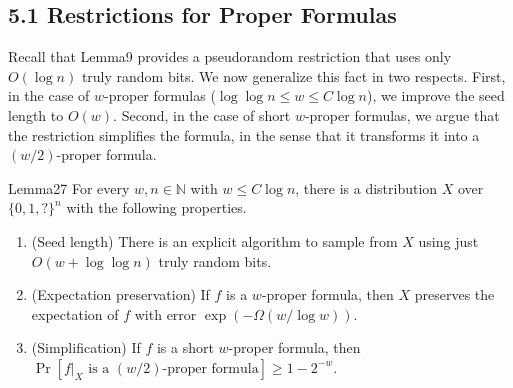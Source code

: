 \subsection*{5.1 Restrictions for Proper Formulas}
Recall that Lemma9 provides a pseudorandom restriction that uses only $O(\log n)$ truly random bits. We now generalize this fact in two respects. First, in the case of $w$-proper formulas ($\log\log n\le w\le C\log n$), we improve the seed length to $O(w)$. Second, in the case of short $w$-proper formulas, we argue that the restriction simplifies the formula, in the sense that it transforms it into a $(w/2)$-proper formula.
\begin{authorclaim}{Lemma27}
For every $w,n\in\mathbb N$ with $w\le C\log n$, there is a distribution $X$ over $\{0,1,?\}^n$ with the following properties.
\begin{enumerate}
\item (Seed length) There is an explicit algorithm to sample from $X$ using just $O(w+\log\log n)$ truly random bits.
\item (Expectation preservation) If $f$ is a $w$-proper formula, then $X$ preserves the expectation of $f$ with error $\exp(-\Omega(w/\log w))$.
\item (Simplification) If $f$ is a short $w$-proper formula, then $\Pr[f|_X\text{ is a }(w/2)\text{-proper formula}]\ge1-2^{-w}$.
\end{enumerate}
\end{authorclaim}
